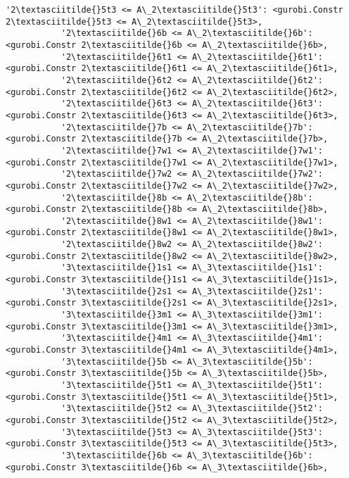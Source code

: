 \documentclass[11pt]{article}
\begin{document}
\begin{Verbatim}[commandchars=\\\{\}]
           '2\textasciitilde{}5t3 <= A\_2\textasciitilde{}5t3': <gurobi.Constr 2\textasciitilde{}5t3 <= A\_2\textasciitilde{}5t3>,
           '2\textasciitilde{}6b <= A\_2\textasciitilde{}6b': <gurobi.Constr 2\textasciitilde{}6b <= A\_2\textasciitilde{}6b>,
           '2\textasciitilde{}6t1 <= A\_2\textasciitilde{}6t1': <gurobi.Constr 2\textasciitilde{}6t1 <= A\_2\textasciitilde{}6t1>,
           '2\textasciitilde{}6t2 <= A\_2\textasciitilde{}6t2': <gurobi.Constr 2\textasciitilde{}6t2 <= A\_2\textasciitilde{}6t2>,
           '2\textasciitilde{}6t3 <= A\_2\textasciitilde{}6t3': <gurobi.Constr 2\textasciitilde{}6t3 <= A\_2\textasciitilde{}6t3>,
           '2\textasciitilde{}7b <= A\_2\textasciitilde{}7b': <gurobi.Constr 2\textasciitilde{}7b <= A\_2\textasciitilde{}7b>,
           '2\textasciitilde{}7w1 <= A\_2\textasciitilde{}7w1': <gurobi.Constr 2\textasciitilde{}7w1 <= A\_2\textasciitilde{}7w1>,
           '2\textasciitilde{}7w2 <= A\_2\textasciitilde{}7w2': <gurobi.Constr 2\textasciitilde{}7w2 <= A\_2\textasciitilde{}7w2>,
           '2\textasciitilde{}8b <= A\_2\textasciitilde{}8b': <gurobi.Constr 2\textasciitilde{}8b <= A\_2\textasciitilde{}8b>,
           '2\textasciitilde{}8w1 <= A\_2\textasciitilde{}8w1': <gurobi.Constr 2\textasciitilde{}8w1 <= A\_2\textasciitilde{}8w1>,
           '2\textasciitilde{}8w2 <= A\_2\textasciitilde{}8w2': <gurobi.Constr 2\textasciitilde{}8w2 <= A\_2\textasciitilde{}8w2>,
           '3\textasciitilde{}1s1 <= A\_3\textasciitilde{}1s1': <gurobi.Constr 3\textasciitilde{}1s1 <= A\_3\textasciitilde{}1s1>,
           '3\textasciitilde{}2s1 <= A\_3\textasciitilde{}2s1': <gurobi.Constr 3\textasciitilde{}2s1 <= A\_3\textasciitilde{}2s1>,
           '3\textasciitilde{}3m1 <= A\_3\textasciitilde{}3m1': <gurobi.Constr 3\textasciitilde{}3m1 <= A\_3\textasciitilde{}3m1>,
           '3\textasciitilde{}4m1 <= A\_3\textasciitilde{}4m1': <gurobi.Constr 3\textasciitilde{}4m1 <= A\_3\textasciitilde{}4m1>,
           '3\textasciitilde{}5b <= A\_3\textasciitilde{}5b': <gurobi.Constr 3\textasciitilde{}5b <= A\_3\textasciitilde{}5b>,
           '3\textasciitilde{}5t1 <= A\_3\textasciitilde{}5t1': <gurobi.Constr 3\textasciitilde{}5t1 <= A\_3\textasciitilde{}5t1>,
           '3\textasciitilde{}5t2 <= A\_3\textasciitilde{}5t2': <gurobi.Constr 3\textasciitilde{}5t2 <= A\_3\textasciitilde{}5t2>,
           '3\textasciitilde{}5t3 <= A\_3\textasciitilde{}5t3': <gurobi.Constr 3\textasciitilde{}5t3 <= A\_3\textasciitilde{}5t3>,
           '3\textasciitilde{}6b <= A\_3\textasciitilde{}6b': <gurobi.Constr 3\textasciitilde{}6b <= A\_3\textasciitilde{}6b>,

\end{Verbatim}
\end{document}
